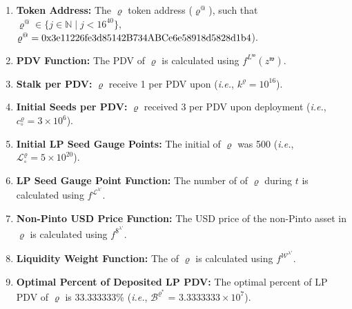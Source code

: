 \documentclass[class=article, crop=false]{standalone}
\begin{document}
\begin{enumerate}

    \item \textbf{Token Address:} The $\varrho$ token address ($\varrho^{@}$), such that $\varrho^{@} \in \{j \in \mathbb{N} \mid j < 16^{40} \}$, $\varrho^{@} = \\ \text{0x3e11226fe3d85142B734ABCe6e58918d5828d1b4}$).
    
    \item \textbf{PDV Function:} The PDV of $\varrho$ is calculated using $f^{L^{\mathfrak{w}}}(z^{\mathfrak{w}})$.
                
    \item \textbf{Stalk per PDV:} $\varrho$  receive 1  per PDV upon  (\textit{i.e.}, $k^{\varrho} = 10^{16}$).
    
    \item \textbf{Initial Seeds per PDV:} $\varrho$  received 3  per PDV upon deployment (\textit{i.e.}, ${c_{\circ}^{\varrho}} = 3 \times 10^6$).

    \item \textbf{Initial LP Seed Gauge Points:} The initial  of $\varrho$ was 500 (\textit{i.e.}, $\mathscr{L}_{\circ}^{\varrho} = 5 \times 10^{20}$).
    
    \item \textbf{LP Seed Gauge Point Function:} The number of  of $\varrho$ during $t$ is calculated using $f^{\mathscr{L}^{\lambda'}}$.

    \item \textbf{Non-Pinto USD Price Function:} The USD price of the non-Pinto asset in $\varrho$ is calculated using $f^{\$^{\lambda'}}$.

    \item \textbf{Liquidity Weight Function:} The  of $\varrho$ is calculated using $f^{\mathscr{W}^{\lambda'}}$.
    
    \item \textbf{Optimal Percent of Deposited LP PDV:} The optimal percent of  LP PDV of $\varrho$ is 33.333333\% (\textit{i.e.}, $\mathscr{B}^{\varrho^{*}}$ = $3.3333333 \times 10^{7}$).


\end{enumerate}
\end{document}
